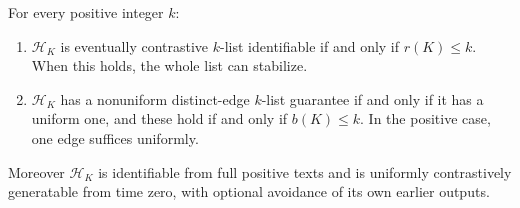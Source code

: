 \begin{theorem}\label{thm:ca:widths}
For every positive integer $k$:
\begin{enumerate}
\item $\mathcal H_K$ is eventually contrastive $k$-list identifiable if and only if $r(K)\le k$. When this holds, the whole list can stabilize.
\item $\mathcal H_K$ has a nonuniform distinct-edge $k$-list guarantee if and only if it has a uniform one, and these hold if and only if $b(K)\le k$. In the positive case, one edge suffices uniformly.
\end{enumerate}
Moreover $\mathcal H_K$ is identifiable from full positive texts and is uniformly contrastively generatable from time zero, with optional avoidance of its own earlier outputs.
\end{theorem}
